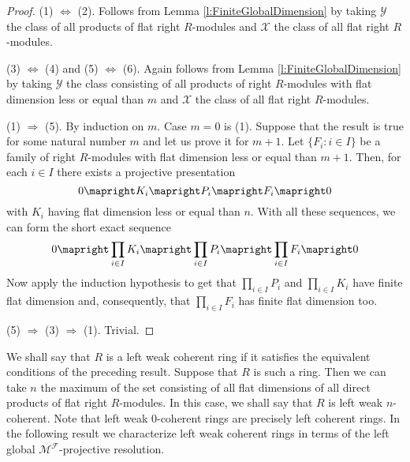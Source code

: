\documentclass[a4paper,10pt]{amsart}
\begin{document}
\begin{proof}
  (1) $\Leftrightarrow$ (2). Follows from Lemma
  \ref{l:FiniteGlobalDimension} by taking $\mathcal Y$ the class of
  all products of flat right $R$-modules and $\mathcal X$ the class of
  all flat right $R$-modules.

  (3) $\Leftrightarrow$ (4) and (5) $\Leftrightarrow$ (6). Again
  follows from Lemma \ref{l:FiniteGlobalDimension} by taking $\mathcal
  Y$ the class consisting of all products of right $R$-modules with
  flat dimension less or equal than $m$ and $\mathcal X$ the class of
  all flat right $R$-modules.

  (1) $\Rightarrow$ (5). By induction on $m$. Case $m=0$ is (1). Suppose that the result is true for some natural
  number $m$ and let us prove it for $m+1$. Let $\{F_i:i \in I\}$ be a
  family of right $R$-modules with flat dimension less or equal than
  $m+1$. Then, for each $i \in I$ there exists a projective
  presentation
  \begin{displaymath}
    0 \mapright K_i \mapright P_i \mapright F_i \mapright 0
  \end{displaymath}
  with $K_i$ having flat dimension less or equal than $n$. With all
  these sequences, we can form the short exact sequence
  \begin{displaymath}
    0 \mapright \prod_{i \in I}K_i \mapright \prod_{i \in I}P_i
    \mapright \prod_{i \in I}F_i \mapright 0
  \end{displaymath}
  Now apply the induction hypothesis to get that $\prod_{i \in I}P_i$
  and $\prod_{i \in I}K_i$ have finite flat dimension and,
  consequently, that $\prod_{i \in I}F_i$ has finite flat dimension
  too.

  (5) $\Rightarrow$ (3) $\Rightarrow$ (1). Trivial.
\end{proof}

We shall say that $R$ is a left weak coherent ring if it satisfies the
equivalent conditions of the preceding result. Suppose that $R$ is
such a ring. Then we can take $n$ the maximum of the set consisting of
all flat dimensions of all direct products of flat right
$R$-modules. In this case, we shall say that $R$ is left weak
$n$-coherent. Note that left weak $0$-coherent rings are precisely
left coherent rings. In the following result we characterize left weak
coherent rings in terms of the left global $\mathcal M^{\mathcal
  F}$-projective resolution.
\end{document}
